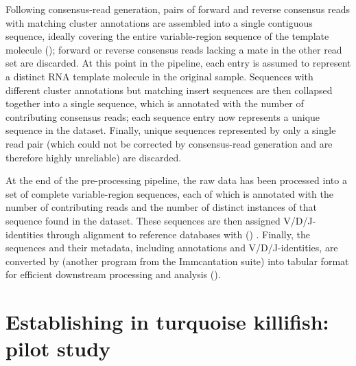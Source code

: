 Following consensus-read generation, pairs of forward and reverse consensus reads with matching cluster annotations are assembled into a single contiguous sequence, ideally covering the entire variable-region sequence of the template molecule (); forward or reverse consensus reads lacking a mate in the other read set are discarded. At this point in the pipeline, each entry is assumed to represent a distinct RNA template molecule in the original sample. Sequences with different cluster annotations but matching insert sequences are then collapsed together into a single sequence, which is annotated with the number of contributing consensus reads; each sequence entry now represents a unique sequence in the dataset. Finally, unique sequences represented by only a single read pair (which could not be corrected by consensus-read generation and are therefore highly unreliable) are discarded.

At the end of the  pre-processing pipeline, the raw data has been processed into a set of complete variable-region sequences, each of which is annotated with the number of contributing reads and the number of distinct instances of that sequence found in the dataset. These sequences are then assigned V/D/J-identities through alignment to reference databases with  () \parencite{ye2013igblast}. Finally, the sequences and their metadata, including annotations and V/D/J-identities, are converted by  (another program from the Immcantation suite) \parencite{gupta2015changeo} into tabular format for efficient downstream processing and analysis ().

\FloatBarrier
\clearpage


\section{Establishing \igseq in turquoise killifish: pilot study}
\label{sec:igseq_pilot}

